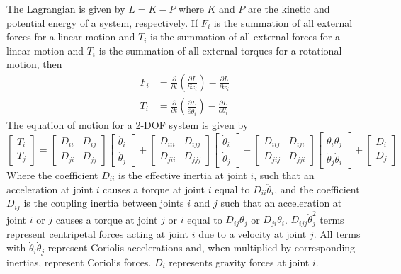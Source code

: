 \documentclass[11pt]{book}
\begin{document}
The Lagrangian is given by $L=K-P$ where $K$ and $P$ are the kinetic and potential energy of a system, respectively. If $F_i$ is the summation of all external forces for a linear motion and $T_i$ is the summation of all external forces for a linear motion and $T_i$ is the summation of all external torques for a rotational motion, then
\begin{equation}
	\begin{aligned}
		F_i&=\frac{\partial}{\partial{t}}\left(\frac{\partial{L}}{\partial\dot{x}_i}\right)-\frac{\partial{L}}{\partial{x_i}}\\
		T_i&=\frac{\partial}{\partial{t}}\left(\frac{\partial{L}}{\partial\dot{\theta}_i}\right)-\frac{\partial{L}}{\partial\theta_i}
	\end{aligned}
\end{equation}
The equation of motion for a 2-DOF system is given by
\begin{equation}
	\begin{bmatrix}
		T_i\\
		T_j
	\end{bmatrix}=
	\begin{bmatrix}
		D_{ii}&D_{ij}\\
		D_{ji}&D_{jj}
	\end{bmatrix}
	\begin{bmatrix}
		\ddot{\theta}_i\\
		\ddot{\theta}_j
	\end{bmatrix}+
	\begin{bmatrix}
		D_{iii}&D_{ijj}\\
		D_{jii}&D_{jjj}
	\end{bmatrix}
	\begin{bmatrix}
		\dot{\theta}_i\\
		\dot{\theta}_j
	\end{bmatrix}+
	\begin{bmatrix}
		D_{iij}&D_{iji}\\
		D_{jij}&D_{jji}
	\end{bmatrix}
	\begin{bmatrix}
		\dot{\theta}_i\dot{\theta}_j\\
		\dot{\theta}_j\dot{\theta}_i
	\end{bmatrix}+
	\begin{bmatrix}
		D_i\\
		D_j
	\end{bmatrix}
\end{equation}
Where the coefficient $D_{ii}$ is the effective inertia at joint $i$, such that an acceleration at joint $i$ causes a torque at joint $i$ equal to $D_{ii}\ddot{\theta}_i$, and the coefficient $D_{ij}$ is the coupling inertia between joints $i$ and $j$ such that an acceleration at joint $i$ or $j$ causes a torque at joint $j$ or $i$ equal to $D_{ij}\ddot{\theta}_j$ or $D_{ji}\ddot{\theta}_i$. $D_{ijj}\dot{\theta}_j^2$ terms represent centripetal forces acting at joint $i$ due to a velocity at joint $j$. All terms with $\dot{\theta}_i\dot{\theta}_j$ represent Coriolis accelerations and, when multiplied by corresponding inertias, represent Coriolis forces. $D_i$ represents gravity forces at joint $i$.
\end{document}
